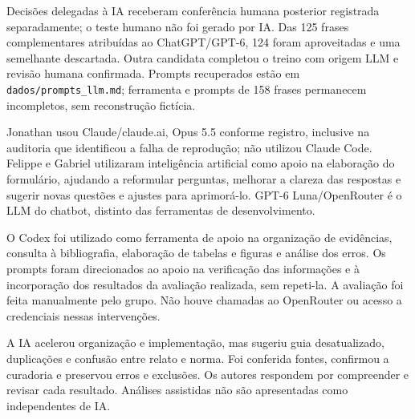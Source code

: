 \documentclass[12pt]{article}
\begin{document}
Decisões delegadas à IA receberam conferência humana posterior registrada
separadamente; o teste humano não foi gerado por IA.
Das 125 frases complementares atribuídas ao ChatGPT/GPT-6, 124 foram aproveitadas
e uma semelhante descartada. Outra candidata completou o treino com origem LLM
e revisão humana confirmada. Prompts recuperados estão em
\texttt{dados/prompts\_llm.md}; ferramenta e prompts de 158 frases permanecem
incompletos, sem reconstrução fictícia.

Jonathan usou Claude/claude.ai, Opus 5.5 conforme registro, inclusive na auditoria
que identificou a falha de reprodução; não utilizou Claude Code.
Felippe e Gabriel utilizaram inteligência artificial como apoio na elaboração do formulário, ajudando a reformular perguntas, melhorar a clareza das respostas e sugerir novas questões e ajustes para aprimorá-lo.
GPT-6 Luna/OpenRouter é o LLM do chatbot, distinto das ferramentas de desenvolvimento.

O Codex foi utilizado como ferramenta de apoio na organização de evidências, consulta à bibliografia, elaboração de tabelas e figuras e análise dos erros. Os prompts foram direcionados ao apoio na verificação das informações e à incorporação dos resultados da avaliação realizada, sem repeti-la. A avaliação foi feita manualmente pelo grupo.
Não houve chamadas ao OpenRouter ou acesso a credenciais nessas intervenções.

A IA acelerou organização e implementação, mas sugeriu guia desatualizado,
duplicações e confusão entre relato e norma. Foi conferida fontes,
confirmou a curadoria e preservou erros e exclusões. Os autores respondem por compreender e revisar cada resultado.
Análises assistidas não são apresentadas como independentes de IA.






\end{document}
